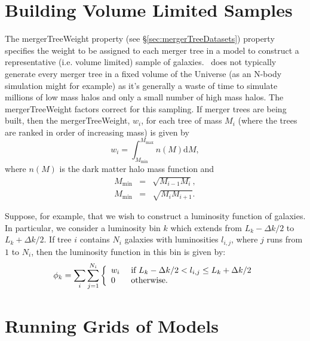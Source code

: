 \section{Building Volume Limited Samples}\label{sec:volumeLimitedSamples}

The {\normalfont \ttfamily mergerTreeWeight} property (see \S\ref{sec:mergerTreeDatasets}) property specifies the weight to be assigned to each merger tree in a model to construct a representative (i.e. volume limited) sample of galaxies. \glc\ does not typically generate every merger tree in a fixed volume of the Universe (as an N-body simulation might for example) as it's generally a waste of time to simulate millions of low mass halos and only a small number of high mass halos. The {\normalfont \ttfamily mergerTreeWeight} factors correct for this sampling. If merger trees are being built, then the {\normalfont \ttfamily mergerTreeWeight}, $w_i$, for each tree of mass $M_i$ (where the trees are ranked in order of increasing mass) is given by
\begin{equation}
 w_i = \int_{M_\mathrm{min}}^{M_\mathrm{max}} n(M) \mathrm{d}M,
\end{equation}
where $n(M)$ is the dark matter halo mass function and
\begin{eqnarray}
 M_\mathrm{min} &=& \sqrt{M_{i-1}M_i}, \\
 M_\mathrm{min} &=& \sqrt{M_i M_{i+1}}.
\end{eqnarray}

Suppose, for example, that we wish to construct a luminosity function of galaxies. In particular, we consider a luminosity bin $k$ which extends from $L_k-\Delta k/2$ to $L_k+\Delta k/2$. If tree $i$ contains $N_i$ galaxies with luminosities $l_{i,j}$, where $j$ runs from $1$ to $N_i$, then the luminosity function in this bin is given by:
\begin{equation}
 \phi_k = \sum_i \sum_{j=1}^{N_i} \left\{ \begin{array}{ll} w_i & \hbox{ if  } L_k-\Delta k/2 < l_{i,j} \le L_k+\Delta k/2 \\ 0 & \hbox{ otherwise.} \end{array} \right.
\end{equation}

\section{Running Grids of Models}\label{sec:RunningGrids}

